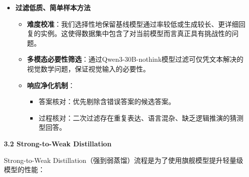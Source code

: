 \documentclass[zihao=false,fontset=windows]{ctexart}
\begin{document}
\begin{itemize}[label=\textcolor{feishuBlue}{2.}]
\item \textbf{过滤低质、简单样本方法}
\begin{itemize}[label=\textcolor{feishuBlue}{\textbullet}]
\item \textbf{难度校准}：我们选择性地保留基线模型通过率较低或生成较长、更详细回复的实例。这使得数据集中包含了对当前模型而言真正具有挑战性的问题。

\end{itemize}

\begin{itemize}[label=\textcolor{feishuBlue}{\textbullet}]
\item \textbf{多模态必要性筛选}：通过Qwen3-30B-nothink模型过滤可仅凭文本解决的视觉数学问题，保证视觉输入的必要性。

\end{itemize}

\begin{itemize}[label=\textcolor{feishuBlue}{\textbullet}]
\item \textbf{响应净化机制}：
\begin{itemize}[label=\textcolor{feishuBlue}{\textbullet}]
\item 答案核对：优先剔除含错误答案的候选答案。

\end{itemize}

\begin{itemize}[label=\textcolor{feishuBlue}{\textbullet}]
\item 过程核对：二次过滤存在重复表达、语言混杂、缺乏逻辑推演的猜测型回答。

\end{itemize}

\end{itemize}

\end{itemize}

\Needspace{2cm}\par\vspace{0.9em}\begin{tcolorbox}[enhanced,colback=headOrange,boxrule=0pt,arc=4pt,boxsep=0pt,left=3pt,right=3pt,top=2pt,bottom=2pt,before skip=0pt,after skip=3pt]\bfseries \textcolor{feishuBlue}{3.2} Strong-to-Weak Distillation\end{tcolorbox}

Strong-to-Weak Distillation（强到弱蒸馏）流程是为了使用旗舰模型提升轻量级模型的性能：\par
\end{document}
